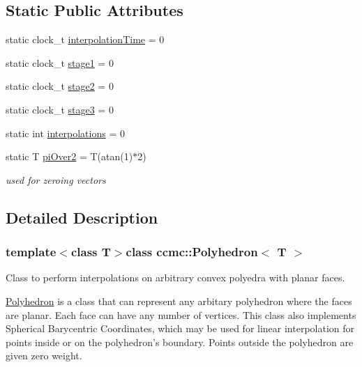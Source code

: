 \subsection*{Static Public Attributes}
\begin{DoxyCompactItemize}
\item 
static clock\-\_\-t \hyperlink{classccmc_1_1_polyhedron_a436708606125ba1059465516aeb2b401}{interpolation\-Time} = 0
\item 
static clock\-\_\-t \hyperlink{classccmc_1_1_polyhedron_aacd29b2b3045dbbc36ef47db91054d48}{stage1} = 0
\item 
static clock\-\_\-t \hyperlink{classccmc_1_1_polyhedron_adb2d70dc6f7af2654dd668bb3940caac}{stage2} = 0
\item 
static clock\-\_\-t \hyperlink{classccmc_1_1_polyhedron_a47a9b8072039bf50deb15bffb7827012}{stage3} = 0
\item 
static int \hyperlink{classccmc_1_1_polyhedron_a98484d47a61f7fb916e45a4d4c381d08}{interpolations} = 0
\item 
static T \hyperlink{classccmc_1_1_polyhedron_a30dd6a2116a1aaad90753c8c0309eda6}{pi\-Over2} = T(atan(1)$\ast$2)
\begin{DoxyCompactList}\small\item\em used for zeroing vectors \end{DoxyCompactList}\end{DoxyCompactItemize}


\subsection{Detailed Description}
\subsubsection*{template$<$class T$>$class ccmc\-::\-Polyhedron$<$ T $>$}

Class to perform interpolations on arbitrary convex polyedra with planar faces. 

\hyperlink{classccmc_1_1_polyhedron}{Polyhedron} is a class that can represent any arbitary polyhedron where the faces are planar. Each face can have any number of vertices. This class also implements Spherical Barycentric Coordinates, which may be used for linear interpolation for points inside or on the polyhedron's boundary. Points outside the polyhedron are given zero weight. 

